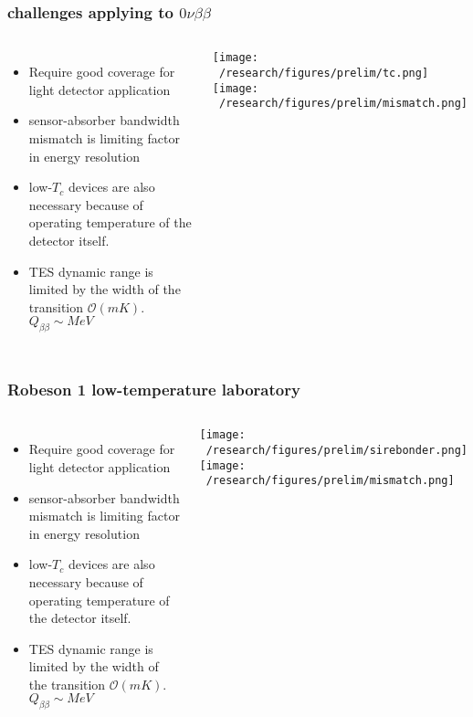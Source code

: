 \documentclass{beamer}
\begin{document}
	\begin{frame}
		\frametitle{challenges applying to $0\nu\beta\beta$}
		\begin{columns}[c] %
			
			\begin{itemize}
				\setlength\itemsep{2em}
				\item Require good coverage for light detector application
				\item sensor-absorber bandwidth mismatch is limiting factor in energy resolution
				\item low-$T_c$ devices are also necessary because of operating temperature of the detector itself.
				\item TES dynamic range is limited by the width of the transition $\mathcal{O}(mK)$. $Q_{\beta\beta} \sim MeV$
			\end{itemize}
			
			\texttt{[image: ~/research/figures/prelim/tc.png]}
			\texttt{[image: ~/research/figures/prelim/mismatch.png]}
			
		\end{columns}
	\end{frame}	
	
	\begin{frame}
		\frametitle{Robeson 1 low-temperature laboratory}
		\begin{columns}[c] %
			
			\begin{itemize}
				\setlength\itemsep{2em}
				\item Require good coverage for light detector application
				\item sensor-absorber bandwidth mismatch is limiting factor in energy resolution
				\item low-$T_c$ devices are also necessary because of operating temperature of the detector itself.
				\item TES dynamic range is limited by the width of the transition $\mathcal{O}(mK)$. $Q_{\beta\beta} \sim MeV$
			\end{itemize}
			
			\texttt{[image: ~/research/figures/prelim/sirebonder.png]}
			\texttt{[image: ~/research/figures/prelim/mismatch.png]}
			
		\end{columns}
	\end{frame}	
	
	
	
\end{document}
